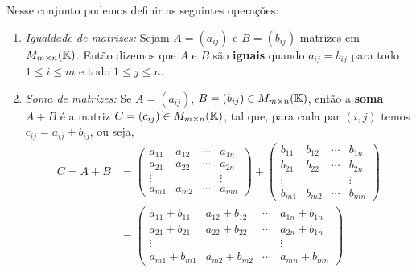 Nesse conjunto podemos definir as seguintes opera\c{c}\~oes:
\begin{enumerate}
    \item \textit{Igualdade de matrizes:} Sejam $A = (a_{ij})$ e $B = (b_{ij})$ matrizes em $M_{m \times n}(\mathbb{K})$. Então dizemos que $A$
        e $B$ são \textbf{iguais} quando $a_{ij} = b_{ij}$ para todo $1 \le i \le m$ e todo $1 \le j \le n$.

    \item \textit{Soma de matrizes:} Se $A = (a_{ij})$, $B = (b_{ij}) \in M_{m\times n}(\mathbb{K})$, ent\~ao a
        \textbf{soma} $A + B$ \'e a matriz $C = (c_{ij}) \in M_{m\times n}(\mathbb{K})$, tal que, para cada par $(i,j)$ temos $c_{ij} = a_{ij} + b_{ij}$, ou seja,
	\begin{align*}
		C = A + B &= \begin{pmatrix}
		a_{11} & a_{12} & \cdots & a_{1n}\\
		a_{21} & a_{22} & \cdots & a_{2n}\\
		\vdots & & & \vdots\\
		a_{m1} & a_{m2} & \cdots & a_{mn}
	\end{pmatrix} + \begin{pmatrix}
		b_{11} & b_{12} & \cdots & b_{1n}\\
		b_{21} & b_{22} & \cdots & b_{2n}\\
		\vdots & & & \vdots\\
		b_{m1} & b_{m2} & \cdots & b_{mn}
	\end{pmatrix}\\ &= \begin{pmatrix}
		a_{11} + b_{11} & a_{12} + b_{12} & \cdots & a_{1n} + b_{1n}\\
		a_{21} + b_{21} & a_{22} + b_{22}& \cdots & a_{2n} + b_{1n}\\
		\vdots & & & \vdots\\
		a_{m1} + b_{m1} & a_{m2} + b_{m2}& \cdots & a_{mn} + b_{mn}
	\end{pmatrix}
	\end{align*}


\end{enumerate}

